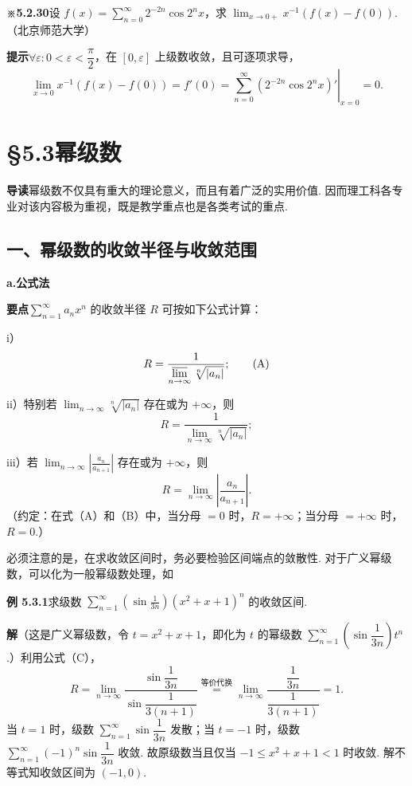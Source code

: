 \documentclass[UTF8, 12pt, fontset=fandol, oneside]{ctexart}
\begin{document}
\noindent\textbf{※5.2.30}\quad 设 $f(x)=\displaystyle\sum_{n=0}^{\infty}2^{-2n}\cos 2^nx$，求
$\displaystyle\lim_{x\to0+}x^{-1}(f(x)-f(0))$.（北京师范大学）

\noindent\textbf{提示}\quad $\forall\varepsilon:0<\varepsilon<\dfrac\pi2$，在 $[0,\varepsilon]$ 上级数收敛，且可逐项求导，
\[
  \lim_{x\to0}x^{-1}(f(x)-f(0))=f'(0)
  =\left.\sum_{n=0}^{\infty}(2^{-2n}\cos2^nx)'\right|_{x=0}=0.
\]

\section*{§5.3\quad 幂级数}

\noindent\textbf{导读}\quad 幂级数不仅具有重大的理论意义，而且有着广泛的实用价值. 因而理工科各专业对该内容极为重视，既是教学重点也是各类考试的重点.

\subsection*{一、幂级数的收敛半径与收敛范围}

\noindent\textbf{a.\quad 公式法}

\noindent\textbf{要点}\quad $\displaystyle\sum_{n=1}^{\infty}a_nx^n$ 的收敛半径 $R$ 可按如下公式计算：

i）
\[
  R=\frac1{\displaystyle\varlimsup_{n\to\infty}\sqrt[n]{|a_n|}};
\tag{A}
\]

ii）特别若 $\displaystyle\lim_{n\to\infty}\sqrt[n]{|a_n|}$ 存在或为 $+\infty$，则
\[
  R=\frac1{\displaystyle\lim_{n\to\infty}\sqrt[n]{|a_n|}};
\tag{B}
\]

iii）若 $\displaystyle\lim_{n\to\infty}\left|\frac{a_n}{a_{n+1}}\right|$ 存在或为 $+\infty$，则
\[
  R=\lim_{n\to\infty}\left|\frac{a_n}{a_{n+1}}\right|.
\tag{C}
\]
（约定：在式（A）和（B）中，当分母 $=0$ 时，$R=+\infty$；当分母 $=+\infty$ 时，$R=0$.）

必须注意的是，在求收敛区间时，务必要检验区间端点的敛散性. 对于广义幂级数，可以化为一般幂级数处理，如

\noindent\textbf{例 5.3.1}\quad 求级数
$\displaystyle\sum_{n=1}^{\infty}\left(\sin\frac1{3n}\right)(x^2+x+1)^n$ 的收敛区间.

\noindent\textbf{解}\quad （这是广义幂级数，令 $t=x^2+x+1$，即化为 $t$ 的幂级数
$\displaystyle\sum_{n=1}^{\infty}\left(\sin\dfrac1{3n}\right)t^n$.）利用公式（C），
\[
  R=\lim_{n\to\infty}\frac{\sin\dfrac1{3n}}{\sin\dfrac1{3(n+1)}}
  \overset{\text{等价代换}}=
  \lim_{n\to\infty}\frac{\dfrac1{3n}}{\dfrac1{3(n+1)}}=1.
\]
当 $t=1$ 时，级数 $\displaystyle\sum_{n=1}^{\infty}\sin\dfrac1{3n}$ 发散；当 $t=-1$ 时，级数
$\displaystyle\sum_{n=1}^{\infty}(-1)^n\sin\dfrac1{3n}$ 收敛. 故原级数当且仅当
$-1\le x^2+x+1<1$ 时收敛. 解不等式知收敛区间为 $(-1,0)$.
\end{document}
